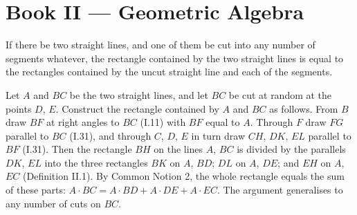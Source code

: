 %
%

\section{Book II --- Geometric Algebra}
\label{sec:book-II}

\begin{claim}
\label{prop:II.1}
If there be two straight lines, and one of them be cut into any
number of segments whatever, the rectangle contained by the two
straight lines is equal to the rectangles contained by the
uncut straight line and each of the segments.
\end{claim}
\begin{evidence}[Proof of II.1]
\label{ev:II.1}
Let $A$ and $BC$ be the two straight lines, and let $BC$ be cut at
random at the points $D$, $E$.  Construct the rectangle contained by
$A$ and $BC$ as follows.  From $B$ draw $BF$ at right angles to $BC$
(I.11) with $BF$ equal to $A$.  Through $F$ draw $FG$ parallel to $BC$
(I.31), and through $C$, $D$, $E$ in turn draw $CH$, $DK$, $EL$
parallel to $BF$ (I.31).  Then the rectangle $BH$ on the lines $A$,
$BC$ is divided by the parallels $DK$, $EL$ into the three rectangles
$BK$ on $A$, $BD$; $DL$ on $A$, $DE$; and $EH$ on $A$, $EC$
(Definition II.1).  By Common Notion 2, the whole rectangle equals
the sum of these parts: $A \cdot BC = A\cdot BD + A\cdot DE +
A\cdot EC$.  The argument generalises to any number of cuts on $BC$.
\end{evidence}

